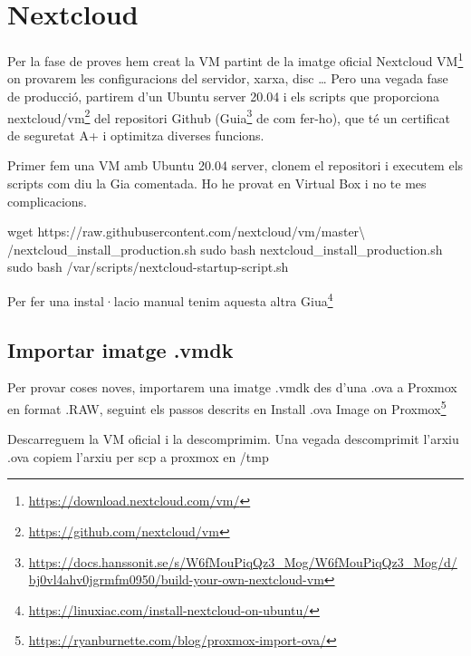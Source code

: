 \documentclass[
  10pt,
]{krantz}
\newenvironment{Shaded}{\begin{snugshade}}{\end{snugshade}}
\newcommand{\AttributeTok}[1]{\textcolor[rgb]{0.77,0.63,0.00}{#1}}
\newcommand{\DataTypeTok}[1]{\textcolor[rgb]{0.13,0.29,0.53}{#1}}
\newcommand{\ExtensionTok}[1]{#1}
\newcommand{\FunctionTok}[1]{\textcolor[rgb]{0.00,0.00,0.00}{#1}}
\newcommand{\NormalTok}[1]{#1}
\DeclareRobustCommand{\href}[2]{#2\footnote{\url{#1}}}
\begin{document}
\hypertarget{nextcloud}{%
\chapter{Nextcloud}\label{nextcloud}}

Per la fase de proves hem creat la VM partint de la imatge oficial \href{https://download.nextcloud.com/vm/}{Nextcloud VM} on provarem les configuracions del servidor, xarxa, disc \ldots{} Pero una vegada fase de producció, partirem d'un Ubuntu server 20.04 i els scripts que proporciona \href{https://github.com/nextcloud/vm}{nextcloud/vm} del repositori Github (\href{https://docs.hanssonit.se/s/W6fMouPiqQz3_Mog/W6fMouPiqQz3_Mog/d/bj0vl4ahv0jgrmfm0950/build-your-own-nextcloud-vm}{Guia} de com fer-ho), que té un certificat de seguretat A+ i optimitza diverses funcions.

Primer fem una VM amb Ubuntu 20.04 server, clonem el repositori i executem els scripts com diu la Gia comentada. Ho he provat en Virtual Box i no te mes complicacions.

\begin{Shaded}
\begin{Highlighting}[]
\FunctionTok{wget}\NormalTok{ https://raw.githubusercontent.com/nextcloud/vm/master}\DataTypeTok{\textbackslash{}}
\NormalTok{/nextcloud\_install\_production.sh}
\FunctionTok{sudo}\NormalTok{ bash nextcloud\_install\_production.sh}
\FunctionTok{sudo}\NormalTok{ bash /var/scripts/nextcloud{-}startup{-}script.sh}
\end{Highlighting}
\end{Shaded}

Per fer una instal·lacio manual tenim aquesta altra \href{https://linuxiac.com/install-nextcloud-on-ubuntu/}{Giua}

\hypertarget{importar-imatge-.vmdk}{%
\section{Importar imatge .vmdk}\label{importar-imatge-.vmdk}}

Per provar coses noves, importarem una imatge .vmdk des d'una .ova a Proxmox en format .RAW, seguint els passos descrits en \href{https://ryanburnette.com/blog/proxmox-import-ova/}{Install .ova Image on Proxmox}

Descarreguem la VM oficial i la descomprimim. Una vegada descomprimit l'arxiu .ova copiem l'arxiu per scp a proxmox en /tmp

\begin{Shaded}
\end{Shaded}
\end{document}
